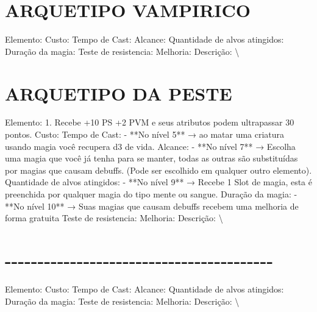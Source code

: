 \documentclass{article}%
\begin{document}
%
\section{ARQUETIPO VAMPIRICO}%
\label{sec:ARQUETIPOVAMPIRICO}%
Elemento: \newline%
Custo: \newline%
Tempo de Cast: \newline%
Alcance: \newline%
Quantidade de alvos atingidos: \newline%
Duração da magia: \newline%
Teste de resistencia: \newline%
Melhoria: \newline%
Descrição: \textbackslash{}

%
\section{ARQUETIPO DA PESTE}%
\label{sec:ARQUETIPODAPESTE}%
Elemento: 1. Recebe +10 PS +2 PVM e seus atributos podem ultrapassar 30 pontos.\newline%
Custo: \newline%
Tempo de Cast: {-} **No nível 5** → ao matar uma criatura usando magia você recupera d3 de vida.\newline%
Alcance: {-} **No nível 7** → Escolha uma magia que você já tenha para se manter, todas as outras são substituídas por magias que causam debuffs. (Pode ser escolhido em qualquer outro elemento).\newline%
Quantidade de alvos atingidos: {-} **No nível 9** → Recebe 1 Slot de magia, esta é preenchida por qualquer magia do tipo mente ou sangue.\newline%
Duração da magia: {-} **No nível 10** → Suas magias que causam debuffs recebem uma melhoria de forma gratuita\newline%
Teste de resistencia: \newline%
Melhoria: \newline%
Descrição: \textbackslash{}

%
\section{{-}{-}{-}{-}{-}{-}{-}{-}{-}{-}{-}{-}{-}{-}{-}{-}{-}{-}{-}{-}{-}{-}{-}{-}{-}{-}{-}{-}{-}{-}{-}{-}{-}{-}{-}{-}{-}{-}{-}{-}{-}}%
\label{sec:{-}{-}{-}{-}{-}{-}{-}{-}{-}{-}{-}{-}{-}{-}{-}{-}{-}{-}{-}{-}{-}{-}{-}{-}{-}{-}{-}{-}{-}{-}{-}{-}{-}{-}{-}{-}{-}{-}{-}{-}{-}}%
Elemento: \newline%
Custo: \newline%
Tempo de Cast: \newline%
Alcance: \newline%
Quantidade de alvos atingidos: \newline%
Duração da magia: \newline%
Teste de resistencia: \newline%
Melhoria: \newline%
Descrição: \textbackslash{}
\end{document}

